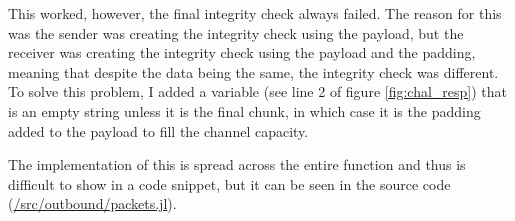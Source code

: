 This worked, however, the final integrity check always failed. The reason for this was the sender was creating the integrity check using the payload, but the receiver was creating the integrity check using the payload and the padding, meaning that despite the data being the same, the integrity check was different. To solve this problem, I added a variable  (see line 2 of figure \ref{fig:chal_resp}) that is an empty string unless it is the final chunk, in which case it is the padding added to the payload to fill the channel capacity. 

The implementation of this is spread across the entire  function and thus is difficult to show in a code snippet, but it can be seen in the source code (\url{/src/outbound/packets.jl}).